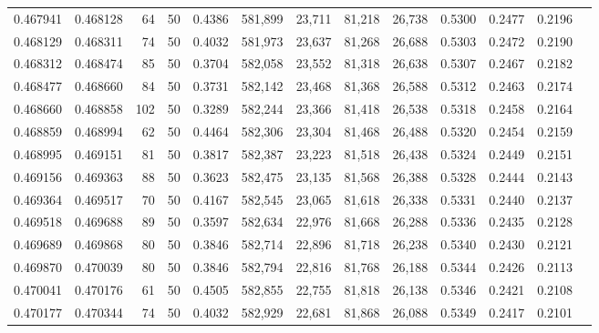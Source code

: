 \begin{tabular}{rrrrrrrrrrrrr}
0.467941 & 0.468128 &    64 &  50 &                                     0.4386 & 581,899 &  23,711 &  81,218 &  26,738 & 0.5300 & 0.2477 & 0.2196 \\
0.468129 & 0.468311 &    74 &  50 &                                     0.4032 & 581,973 &  23,637 &  81,268 &  26,688 & 0.5303 & 0.2472 & 0.2190 \\
0.468312 & 0.468474 &    85 &  50 &                                     0.3704 & 582,058 &  23,552 &  81,318 &  26,638 & 0.5307 & 0.2467 & 0.2182 \\
0.468477 & 0.468660 &    84 &  50 &                                     0.3731 & 582,142 &  23,468 &  81,368 &  26,588 & 0.5312 & 0.2463 & 0.2174 \\
0.468660 & 0.468858 &   102 &  50 &                                     0.3289 & 582,244 &  23,366 &  81,418 &  26,538 & 0.5318 & 0.2458 & 0.2164 \\
0.468859 & 0.468994 &    62 &  50 &                                     0.4464 & 582,306 &  23,304 &  81,468 &  26,488 & 0.5320 & 0.2454 & 0.2159 \\
0.468995 & 0.469151 &    81 &  50 &                                     0.3817 & 582,387 &  23,223 &  81,518 &  26,438 & 0.5324 & 0.2449 & 0.2151 \\
0.469156 & 0.469363 &    88 &  50 &                                     0.3623 & 582,475 &  23,135 &  81,568 &  26,388 & 0.5328 & 0.2444 & 0.2143 \\
0.469364 & 0.469517 &    70 &  50 &                                     0.4167 & 582,545 &  23,065 &  81,618 &  26,338 & 0.5331 & 0.2440 & 0.2137 \\
0.469518 & 0.469688 &    89 &  50 &                                     0.3597 & 582,634 &  22,976 &  81,668 &  26,288 & 0.5336 & 0.2435 & 0.2128 \\
0.469689 & 0.469868 &    80 &  50 &                                     0.3846 & 582,714 &  22,896 &  81,718 &  26,238 & 0.5340 & 0.2430 & 0.2121 \\
0.469870 & 0.470039 &    80 &  50 &                                     0.3846 & 582,794 &  22,816 &  81,768 &  26,188 & 0.5344 & 0.2426 & 0.2113 \\
0.470041 & 0.470176 &    61 &  50 &                                     0.4505 & 582,855 &  22,755 &  81,818 &  26,138 & 0.5346 & 0.2421 & 0.2108 \\
0.470177 & 0.470344 &    74 &  50 &                                     0.4032 & 582,929 &  22,681 &  81,868 &  26,088 & 0.5349 & 0.2417 & 0.2101 \\

\end{tabular}
